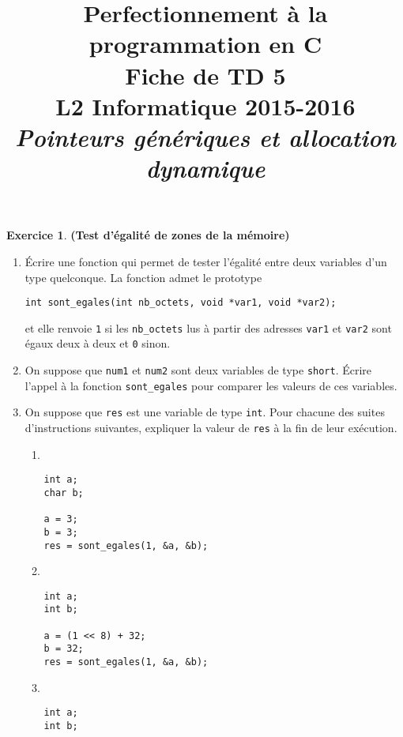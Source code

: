 \documentclass[12pt]{article}
\date{}
\title{{\bf Perfectionnement à la programmation en {\sf C}} \\
    Fiche de TD 5 \\
    {\small L2 Informatique 2015-2016} \\
    {\it \small Pointeurs génériques et allocation dynamique}}
\theoremstyle{definition}
\newtheorem{Exercice}{Exercice}
\begin{document}
\maketitle

\begin{Exercice} {\bf (Test d'égalité de zones de la mémoire)}\smallskip
\begin{enumerate}
    \item Écrire une fonction qui permet de tester l'égalité entre deux
    variables d'un type quelconque. La fonction admet le prototype
\begin{lstlisting}
int sont_egales(int nb_octets, void *var1, void *var2);
\end{lstlisting}
    et elle renvoie {\tt 1} si les {\tt nb\_octets} lus à partir des adresses
    {\tt var1} et {\tt var2} sont égaux deux à deux et {\tt 0} sinon.
    \smallskip

    \item On suppose que {\tt num1} et {\tt num2} sont deux variables
    de type {\tt short}. Écrire l'appel à la fonction {\tt sont\_egales}
    pour comparer les valeurs de ces variables.
    \smallskip

    \item On suppose que {\tt res} est une variable de type {\tt int}.
    Pour chacune des suites d'instructions suivantes, expliquer la
    valeur de {\tt res} à la fin de leur exécution.
    \begin{multicols}{2}
        \begin{enumerate}[label = ({\alph*})]
            \item ~
\begin{lstlisting}
int a;
char b;

a = 3;
b = 3;
res = sont_egales(1, &a, &b);
\end{lstlisting}

            \item ~
\begin{lstlisting}
int a;
int b;

a = (1 << 8) + 32;
b = 32;
res = sont_egales(1, &a, &b);
\end{lstlisting}

            \item ~
\begin{lstlisting}
int a;
int b;


\end{lstlisting}
\end{enumerate}
\end{multicols}
\end{enumerate}
\end{Exercice}
\end{document}
